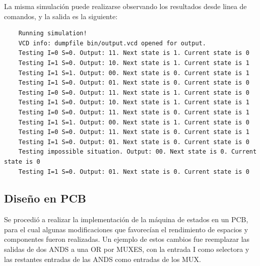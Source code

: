 La misma simulación puede realizarse observando los resultados desde linea de comandos, y la salida es la siguiente:
\begin{lstlisting}
    Running simulation!
    VCD info: dumpfile bin/output.vcd opened for output.
    Testing I=0 S=0. Output: 11. Next state is 1. Current state is 0
    Testing I=1 S=0. Output: 10. Next state is 1. Current state is 1
    Testing I=1 S=1. Output: 00. Next state is 0. Current state is 1
    Testing I=1 S=0. Output: 01. Next state is 0. Current state is 0
    Testing I=0 S=0. Output: 11. Next state is 1. Current state is 0
    Testing I=1 S=0. Output: 10. Next state is 1. Current state is 1
    Testing I=0 S=0. Output: 11. Next state is 0. Current state is 1
    Testing I=1 S=1. Output: 00. Next state is 1. Current state is 0
    Testing I=0 S=0. Output: 11. Next state is 0. Current state is 1
    Testing I=1 S=0. Output: 01. Next state is 0. Current state is 0
    Testing impossible situation. Output: 00. Next state is 0. Current state is 0
    Testing I=1 S=0. Output: 01. Next state is 0. Current state is 0
\end{lstlisting}



\subsection{Diseño en PCB}
Se procedió a realizar la implementación de la máquina de estados en un PCB, para el cual algunas modificaciones que favorecían  el rendimiento de espacios y componentes 
fueron realizadas.
Un ejemplo de estos cambios fue reemplazar las salidas de dos ANDS a una OR por MUXES, con la entrada I como selectora y las restantes entradas de las ANDS como entradas 
de los MUX.

